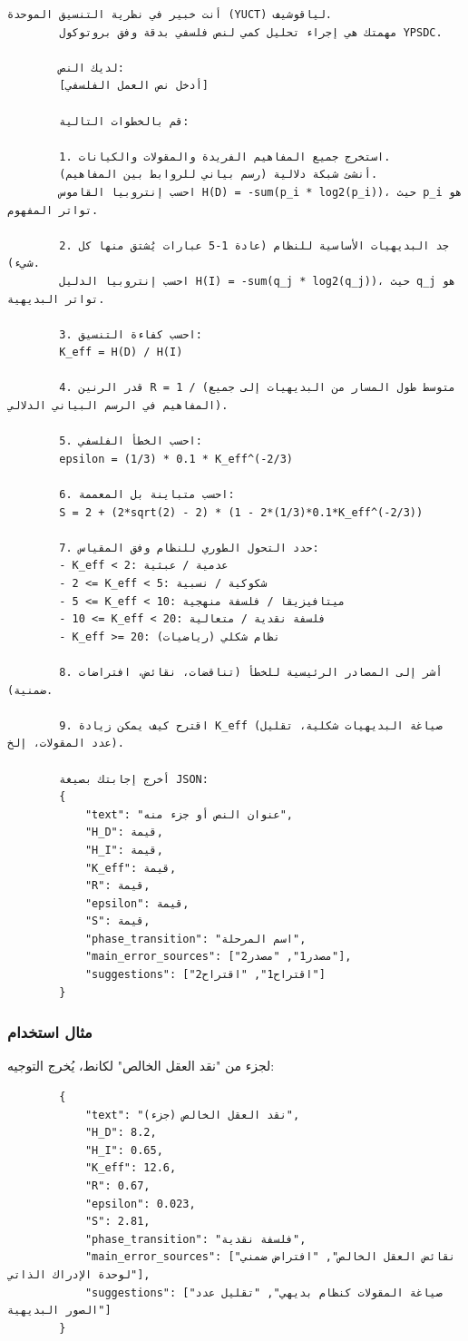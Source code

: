 \documentclass[11pt,a4paper]{article}
\begin{document}
	\begin{lstlisting}[basicstyle=\ttfamily\arabicfonttt, breaklines=true, columns=fullflexible, frame=single]
		أنت خبير في نظرية التنسيق الموحدة (YUCT) لياقوشيف.
		مهمتك هي إجراء تحليل كمي لنص فلسفي بدقة وفق بروتوكول YPSDC.
		
		لديك النص:
		[أدخل نص العمل الفلسفي]
		
		قم بالخطوات التالية:
		
		1. استخرج جميع المفاهيم الفريدة والمقولات والكيانات.
		أنشئ شبكة دلالية (رسم بياني للروابط بين المفاهيم).
		احسب إنتروبيا القاموس H(D) = -sum(p_i * log2(p_i))، حيث p_i هو تواتر المفهوم.
		
		2. جد البديهيات الأساسية للنظام (عادة 1-5 عبارات يُشتق منها كل شيء).
		احسب إنتروبيا الدليل H(I) = -sum(q_j * log2(q_j))، حيث q_j هو تواتر البديهية.
		
		3. احسب كفاءة التنسيق:
		K_eff = H(D) / H(I)
		
		4. قدر الرنين R = 1 / (متوسط طول المسار من البديهيات إلى جميع المفاهيم في الرسم البياني الدلالي).
		
		5. احسب الخطأ الفلسفي:
		epsilon = (1/3) * 0.1 * K_eff^(-2/3)
		
		6. احسب متباينة بل المعممة:
		S = 2 + (2*sqrt(2) - 2) * (1 - 2*(1/3)*0.1*K_eff^(-2/3))
		
		7. حدد التحول الطوري للنظام وفق المقياس:
		- K_eff < 2: عدمية / عبثية
		- 2 <= K_eff < 5: شكوكية / نسبية
		- 5 <= K_eff < 10: ميتافيزيقا / فلسفة منهجية
		- 10 <= K_eff < 20: فلسفة نقدية / متعالية
		- K_eff >= 20: نظام شكلي (رياضيات)
		
		8. أشر إلى المصادر الرئيسية للخطأ (تناقضات، نقائض، افتراضات ضمنية).
		
		9. اقترح كيف يمكن زيادة K_eff (صياغة البديهيات شكلية، تقليل عدد المقولات، إلخ).
		
		أخرج إجابتك بصيغة JSON:
		{
			"text": "عنوان النص أو جزء منه",
			"H_D": قيمة,
			"H_I": قيمة,
			"K_eff": قيمة,
			"R": قيمة,
			"epsilon": قيمة,
			"S": قيمة,
			"phase_transition": "اسم المرحلة",
			"main_error_sources": ["مصدر1", "مصدر2"],
			"suggestions": ["اقتراح1", "اقتراح2"]
		}
	\end{lstlisting}
	
	\subsubsection{مثال استخدام}
	
	لجزء من "نقد العقل الخالص" لكانط، يُخرج التوجيه:
	
	\begin{verbatim}
		{
			"text": "نقد العقل الخالص (جزء)",
			"H_D": 8.2,
			"H_I": 0.65,
			"K_eff": 12.6,
			"R": 0.67,
			"epsilon": 0.023,
			"S": 2.81,
			"phase_transition": "فلسفة نقدية",
			"main_error_sources": ["نقائض العقل الخالص", "افتراض ضمني لوحدة الإدراك الذاتي"],
			"suggestions": ["صياغة المقولات كنظام بديهي", "تقليل عدد الصور البديهية"]
		}
	\end{verbatim}
	
\end{document}
